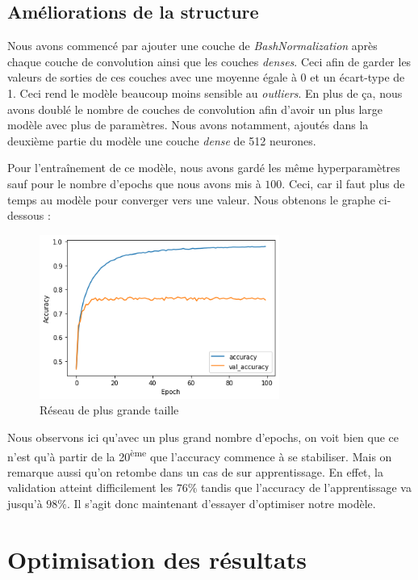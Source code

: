 \documentclass[12pt,titlepage]{article}
\begin{document}
\subsection{Améliorations de la structure}

Nous avons commencé par ajouter une couche de \textit{BashNormalization} après chaque couche de convolution ainsi que les couches \textit{denses}. Ceci afin de garder les valeurs de sorties de ces couches avec une moyenne égale à 0 et un écart-type de 1. Ceci rend le modèle beaucoup moins sensible au \textit{outliers}. En plus de ça, nous avons doublé le nombre de couches de convolution afin d'avoir un plus large modèle avec plus de paramètres. Nous avons notamment, ajoutés dans la deuxième partie du modèle une couche \textit{dense} de 512 neurones.

Pour l'entraînement de ce modèle, nous avons gardé les même hyperparamètres sauf pour le nombre d'epochs que nous avons mis à $100$. Ceci, car il faut plus de temps au modèle pour converger vers une valeur. Nous obtenons le graphe ci-dessous :

\newpage

\begin{figure}[!h]
\centering
\includegraphics[width=0.7\textwidth]{img/Model1_without_dataug_acc.png}
\caption{Réseau de plus grande taille}
\end{figure}
Nous observons ici qu'avec un plus grand nombre d'epochs, on voit bien que ce n'est qu'à partir de la 20\textsuperscript{ème} que l'accuracy commence à se stabiliser. Mais on remarque aussi qu'on retombe dans un cas de sur apprentissage. En effet, la validation atteint difficilement les $76\%$ tandis que l'accuracy de l'apprentissage va jusqu'à $98\%$. Il s'agit donc maintenant d'essayer d'optimiser notre modèle.

\section{Optimisation des résultats}
\end{document}
